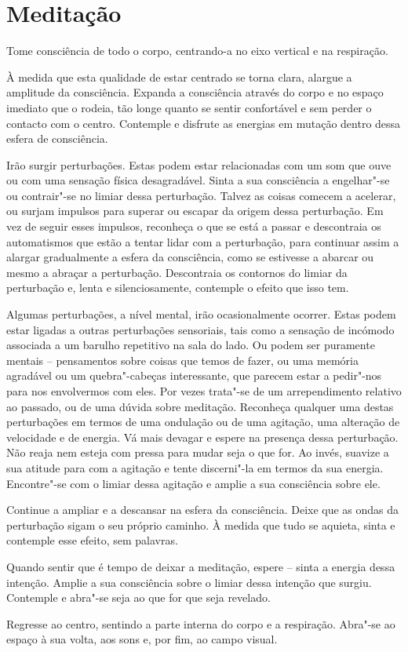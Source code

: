 
\chapter{Meditação}


Tome consciência de todo o corpo, centrando-a no eixo vertical e na respiração.

À medida que esta qualidade de estar centrado se torna clara, alargue a
amplitude da consciência. Expanda a consciência através do corpo e no espaço
imediato que o rodeia, tão longe quanto se sentir confortável e sem perder o
contacto com o centro. Contemple e disfrute as energias em mutação dentro dessa
esfera de consciência.

Irão surgir perturbações. Estas podem estar relacionadas com um som que ouve ou
com uma sensação física desagradável. Sinta a sua consciência a engelhar"-se ou
contrair"-se no limiar dessa perturbação. Talvez as coisas comecem a acelerar,
ou surjam impulsos para superar ou escapar da origem dessa perturbação. Em vez
de seguir esses impulsos, reconheça o que se está a passar e descontraia os
automatismos que estão a tentar lidar com a perturbação, para continuar assim a
alargar gradualmente a esfera da consciência, como se estivesse a abarcar ou
mesmo a abraçar a perturbação. Descontraia os contornos do limiar da perturbação
e, lenta e silenciosamente, contemple o efeito que isso tem.

Algumas perturbações, a nível mental, irão ocasionalmente ocorrer. Estas podem
estar ligadas a outras perturbações sensoriais, tais como a sensação de incómodo
associada a um barulho repetitivo na sala do lado. Ou podem ser puramente
mentais -- pensamentos sobre coisas que temos de fazer, ou uma memória agradável
ou um quebra"-cabeças interessante, que parecem estar a pedir"-nos para nos
envolvermos com eles. Por vezes trata"-se de um arrependimento relativo ao
passado, ou de uma dúvida sobre meditação. Reconheça qualquer uma destas
perturbações em termos de uma ondulação ou de uma agitação, uma alteração de
velocidade e de energia. Vá mais devagar e espere na presença dessa perturbação.
Não reaja nem esteja com pressa para mudar seja o que for. Ao invés, suavize a
sua atitude para com a agitação e tente discerni"-la em termos da sua energia.
Encontre"-se com o limiar dessa agitação e amplie a sua consciência sobre ele.

Continue a ampliar e a descansar na esfera da consciência. Deixe que as ondas da
perturbação sigam o seu próprio caminho. À medida que tudo se aquieta, sinta e
contemple esse efeito, sem palavras.

Quando sentir que é tempo de deixar a meditação, espere -- sinta a energia dessa
intenção. Amplie a sua consciência sobre o limiar dessa intenção que surgiu.
Contemple e abra"-se seja ao que for que seja revelado.

Regresse ao centro, sentindo a parte interna do corpo e a respiração. Abra"-se
ao espaço à sua volta, aos sons e, por fim, ao campo visual.
